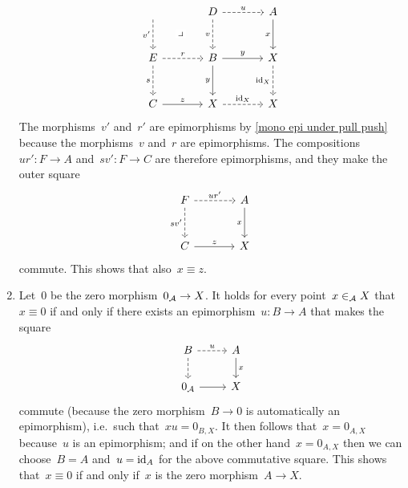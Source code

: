 \begin{remarkdefinition}[continues=abstract points]
\begin{enumerate}[start=3]
\[\begin{tikzcd}[sep = large]
            \arrow[dashed]{d}[left]{v'}
            \arrow[phantom]{dr}[description]{\pb}
          & D
            \arrow[dashed]{r}[above]{u}
            \arrow[dashed]{d}[left]{v}
          & A
            \arrow{d}[left]{x}
          \\
            E
            \arrow[dashed]{r}[above]{r}
            \arrow[dashed]{d}[left]{s}
          & B
            \arrow{r}[above]{y}
            \arrow{d}[left]{y}
          & X
            \arrow[dashed]{d}[left]{\id_X}
          \\
            C
            \arrow{r}[above]{z}
          & X
            \arrow[dashed]{r}[above]{\id_X}
          & X
        \end{tikzcd}
      \]
      The morphisms~$v'$ and~$r'$ are epimorphisms by \cref{mono epi under pull push} because the morphisms~$v$ and~$r$ are epimorphisms.
      The compositions~$u r' \colon F \to A$ and~$s v' \colon F \to C$ are therefore epimorphisms, and they make the outer square
      \[
        \begin{tikzcd}[sep = large]
            F
            \arrow[dashed]{r}[above]{u r'}
            \arrow[dashed]{d}[left]{s v'}
          & A
            \arrow{d}[left]{x}
          \\
            C
            \arrow{r}[above]{z}
          & X
        \end{tikzcd}
      \]
      commute.
      This shows that also~$x \equiv z$.
    \item
      Let~$0$ be the zero morphism~$0_{\mathcal{A}} \to X$.
      It holds for every point~$x \in_{\mathcal{A}} X$ that~$x \equiv 0$ if and only if there exists an epimorphism~$u \colon B \to A$ that makes the square
      \[
        \begin{tikzcd}
            B
            \arrow[dashed]{r}[above]{u}
            \arrow[dashed]{d}
          & A
            \arrow{d}[right]{x}
          \\
            0_\Acat
            \arrow{r}
          & X
        \end{tikzcd}
      \]
      commute (because the zero morphism~$B \to 0$ is automatically an epimorphism), i.e.\ such that~$xu = 0_{B,X}$.
      It then follows that~$x = 0_{A,X}$ because~$u$ is an epimorphism;
      and if on the other hand~$x = 0_{A,X}$ then we can choose~$B = A$ and~$u = \operatorname{id}_A$ for the above commutative square.
      This shows that~$x \equiv 0$ if and only if~$x$ is the zero morphism~$A \to X$.
      

\end{enumerate}
\end{remarkdefinition}
